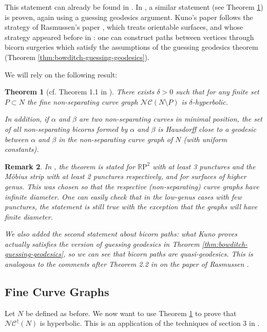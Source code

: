 \documentclass[a4paper]{article}
\newtheorem{theorem}{Theorem}[section]
\newtheorem{remark}[theorem]{Remark}
\newcommand{\rp}{\mathbb{R}\mathrm{P}^2}
\newcommand{\ncg}{\mathcal{NC}}
\newcommand{\fncg}{\mathcal{NC}^\dagger}
\begin{document}
This statement can already be found in \cite{Bestvina-refinement}.
In \cite{kuno-hyperbolicity}, a similar statement (see Theorem \ref{thm:unif-hyperbolicity}) is proven, again using a guessing geodesics argument.
Kuno's paper follows the strategy of Rasmussen's paper \cite{rasmussen}, which treats orientable surfaces, and whose strategy appeared before in \cite{unicorns}:
one can construct paths between vertices through bicorn surgeries which satisfy the assumptions of the guessing geodesics theorem (Theorem \ref{thm:bowditch-guessing-geodesics}).

We will rely on the following result:
\begin{theorem}[cf. Theorem 1.1 in \cite{kuno-hyperbolicity}]\label{thm:unif-hyperbolicity}
    There exists $\delta > 0$ such that for any finite set $P\subset N$ the fine non-separating curve graph $\ncg(N\setminus P)$ is $\delta$-hyperbolic.

    In addition, if $\alpha$ and $\beta$ are two non-separating curves in minimal position, the set of all non-separating bicorns formed by $\alpha$ and $\beta$ is Hausdorff close to a geodesic between $\alpha$ and $\beta$ in the non-separating curve graph of $N$ (with uniform constants).
\end{theorem}

\begin{remark}
    In \cite{kuno-hyperbolicity}, the theorem is stated for $\rp$ with at least 3 punctures and the Möbius strip with at least 2 punctures respectively, and for surfaces of higher genus.
    This was chosen so that the respective (non-separating) curve graphs have infinite diameter.
    One can easily check that in the low-genus cases with few punctures, the statement is still true with the exception that the graphs will have finite diameter.

    We also added the second statement about bicorn paths:
    what Kuno proves actually satisfies the version of guessing geodesics in Theorem \ref{thm:bowditch-guessing-geodesics}, so we can see that bicorn paths are quasi-geodesics.
    This is analogous to the comments after Theorem 2.2 in \cite{BHW2} on the paper of Rasmussen \cite{rasmussen}.
\end{remark}

\subsection{Fine Curve Graphs}
Let $N$ be defined as before.
We now want to use Theorem \ref{thm:unif-hyperbolicity} to prove that $\fncg(N)$ is hyperbolic.
This is an application of the techniques of section 3 in \cite{BHW1}.
\end{document}
